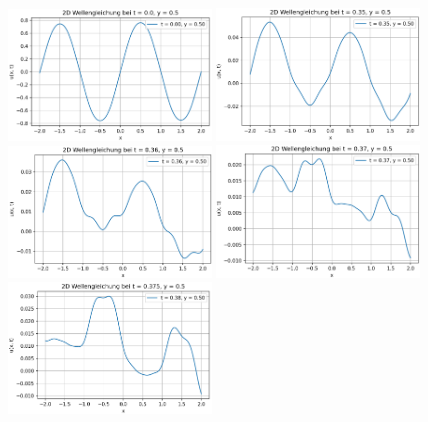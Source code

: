 \begin{figure}
    \includegraphics[width=0.48\textwidth]{papers/neuronal/images/wave_solution_t0.png}\hfill
    \includegraphics[width=0.48\textwidth]{papers/neuronal/images/wave_solution_t035.png}
    \\[\smallskipamount]
    \includegraphics[width=0.48\textwidth]{papers/neuronal/images/wave_solution_t036.png}\hfill
    \includegraphics[width=0.48\textwidth]{papers/neuronal/images/wave_solution_t037.png}
    \\[\smallskipamount]
    \includegraphics[width=0.48\textwidth]{papers/neuronal/images/wave_solution_t0375.png}\hfill

\end{figure}
